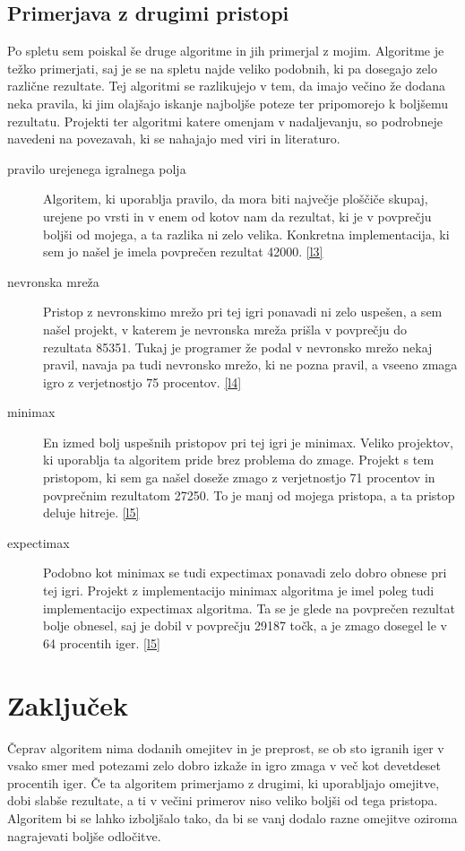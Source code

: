 \documentclass[a4paper,11pt]{article}
\begin{document}
\subsection{Primerjava z drugimi pristopi}
Po spletu sem poiskal še druge algoritme in jih primerjal z mojim. Algoritme je težko primerjati, saj je se na spletu najde veliko podobnih, ki pa dosegajo zelo različne rezultate. Tej algoritmi se razlikujejo v tem, da imajo večino že dodana neka pravila, ki jim olajšajo iskanje najboljše poteze ter pripomorejo k boljšemu rezultatu. Projekti ter algoritmi katere omenjam v nadaljevanju, so podrobneje navedeni na povezavah, ki se nahajajo med viri in literaturo.

\begin{description}
\item[pravilo urejenega igralnega polja]
Algoritem, ki uporablja pravilo, da mora biti največje ploščiče skupaj, urejene po vrsti in v enem od kotov nam da rezultat, ki je v povprečju boljši od mojega, a ta razlika ni zelo velika. Konkretna implementacija, ki sem jo našel je imela povprečen rezultat 42000. \ref{l3}

\item[nevronska mreža]
Pristop z nevronskimo mrežo pri tej igri ponavadi ni zelo uspešen, a sem našel projekt, v katerem je nevronska mreža prišla v povprečju do rezultata 85351. Tukaj je programer že podal v nevronsko mrežo nekaj pravil, navaja pa tudi nevronsko mrežo, ki ne pozna pravil, a vseeno zmaga igro z verjetnostjo 75 procentov. \ref{l4}

\item[minimax]
En izmed bolj uspešnih pristopov pri tej igri je minimax. Veliko projektov, ki uporablja ta algoritem pride brez problema do zmage. Projekt s tem pristopom, ki sem ga našel doseže zmago z verjetnostjo 71 procentov in povprečnim rezultatom 27250. To je manj od mojega pristopa, a ta pristop deluje hitreje. \ref{l5}

\item[expectimax]
Podobno kot minimax se tudi expectimax ponavadi zelo dobro obnese pri tej igri. Projekt z implementacijo minimax algoritma je imel poleg tudi implementacijo expectimax algoritma. Ta se je glede na povprečen rezultat bolje obnesel, saj je dobil v povprečju 29187 točk, a je zmago dosegel le v 64 procentih iger. \ref{l5}

\end{description}

\section{Zaključek}
Čeprav algoritem nima dodanih omejitev in je preprost, se ob sto igranih iger v vsako smer med potezami zelo dobro izkaže in igro zmaga v več kot devetdeset procentih iger. Če ta algoritem primerjamo z drugimi, ki uporabljajo omejitve, dobi slabše rezultate, a ti v večini primerov niso veliko boljši od tega pristopa. Algoritem bi se lahko izboljšalo tako, da bi se vanj dodalo razne omejitve oziroma nagrajevati boljše odločitve.
\end{document}
